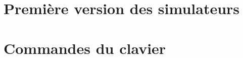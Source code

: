 %
%
\begin{appendix}
\chapter{Première version des simulateurs}


\newpage
\chapter{Commandes du clavier}


%
\end{appendix}
%
%
